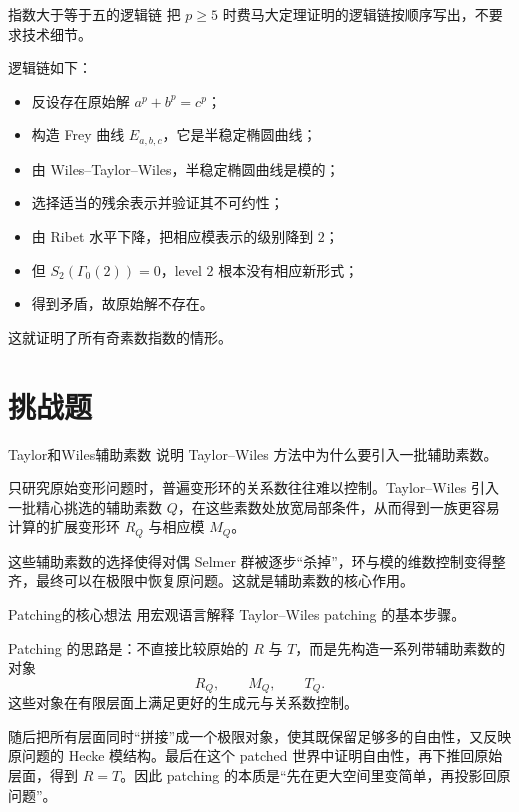 \begin{problem}{指数大于等于五的逻辑链}
\medium
把 $p\ge5$ 时费马大定理证明的逻辑链按顺序写出，不要求技术细节。
\end{problem}
\begin{solution}
逻辑链如下：
\begin{itemize}
\item[(i)] 反设存在原始解 $a^p+b^p=c^p$；
\item[(ii)] 构造 Frey 曲线 $E_{a,b,c}$，它是半稳定椭圆曲线；
\item[(iii)] 由 Wiles--Taylor--Wiles，半稳定椭圆曲线是模的；
\item[(iv)] 选择适当的残余表示并验证其不可约性；
\item[(v)] 由 Ribet 水平下降，把相应模表示的级别降到 $2$；
\item[(vi)] 但 $S_2(\Gamma_0(2))=0$，level $2$ 根本没有相应新形式；
\item[(vii)] 得到矛盾，故原始解不存在。
\end{itemize}
这就证明了所有奇素数指数的情形。
\end{solution}

\section{挑战题 \hard}

\begin{problem}{Taylor和Wiles辅助素数}
\hard
说明 Taylor--Wiles 方法中为什么要引入一批辅助素数。
\end{problem}
\begin{solution}
只研究原始变形问题时，普遍变形环的关系数往往难以控制。Taylor--Wiles 引入一批精心挑选的辅助素数 $Q$，在这些素数处放宽局部条件，从而得到一族更容易计算的扩展变形环 $R_Q$ 与相应模 $M_Q$。

这些辅助素数的选择使得对偶 Selmer 群被逐步“杀掉”，环与模的维数控制变得整齐，最终可以在极限中恢复原问题。这就是辅助素数的核心作用。
\end{solution}

\begin{problem}{Patching的核心想法}
\hard
用宏观语言解释 Taylor--Wiles patching 的基本步骤。
\end{problem}
\begin{solution}
Patching 的思路是：不直接比较原始的 $R$ 与 $T$，而是先构造一系列带辅助素数的对象
\[
R_Q,
\qquad M_Q,
\qquad T_Q.
\]
这些对象在有限层面上满足更好的生成元与关系数控制。

随后把所有层面同时“拼接”成一个极限对象，使其既保留足够多的自由性，又反映原问题的 Hecke 模结构。最后在这个 patched 世界中证明自由性，再下推回原始层面，得到 $R=T$。因此 patching 的本质是“先在更大空间里变简单，再投影回原问题”。
\end{solution}

